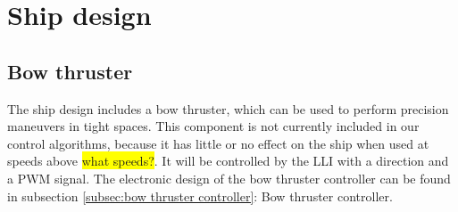 \chapter{Ship design}

\section{Bow thruster}

The ship design includes a bow thruster, which can be used to perform precision maneuvers in tight spaces. This component is not currently included in our control algorithms, because it has little or no effect on the ship when used at speeds above \colorbox{yellow}{what speeds?}. It will be controlled by the \ac{LLI} with a direction and a \ac{PWM} signal. 
\newline
The electronic design of the bow thruster controller can be found in subsection \ref{subsec:bow thruster controller}: Bow thruster controller.



